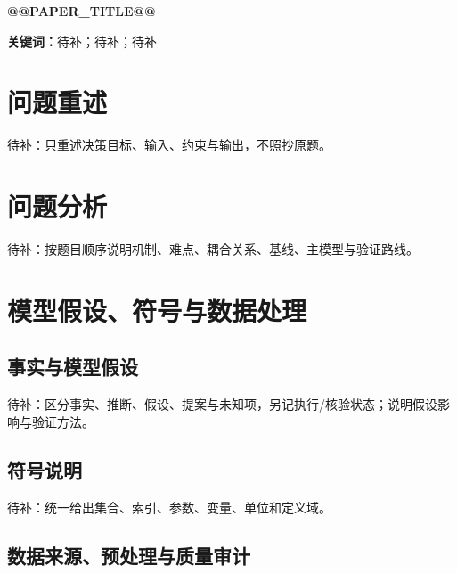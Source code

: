 \documentclass[UTF8,zihao=-4]{ctexart}
\makeatletter
\newcommand{\papertitle}{@@PAPER_TITLE@@}
\makeatother
\begin{document}
\pagestyle{plain}
\setcounter{page}{1}

\begin{center}
  {\bfseries \papertitle\par}
\end{center}
\vspace{0.5em}

\begin{abstract}
待补：按“任务—逐问方法—关键定量结果及条件—验证证据—结论”的顺序撰写，并确保所有数字可追溯。
\end{abstract}

\noindent\textbf{关键词：}待补；待补；待补

\clearpage

\section{问题重述}

待补：只重述决策目标、输入、约束与输出，不照抄原题。

\section{问题分析}

待补：按题目顺序说明机制、难点、耦合关系、基线、主模型与验证路线。

\section{模型假设、符号与数据处理}

\subsection{事实与模型假设}

待补：区分事实、推断、假设、提案与未知项，另记执行/核验状态；说明假设影响与验证方法。

\subsection{符号说明}

待补：统一给出集合、索引、参数、变量、单位和定义域。

\subsection{数据来源、预处理与质量审计}
\end{document}
